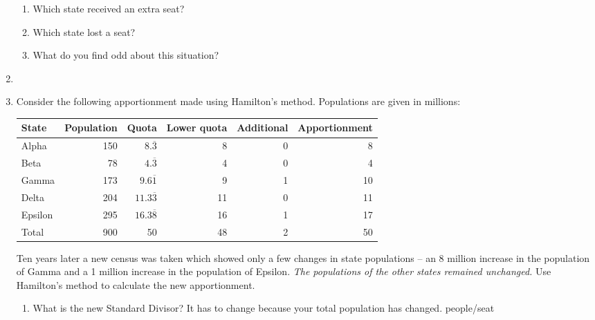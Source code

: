 \begin{enumerate}
\begin{enumerate}
	
		\item Which state received an extra seat?\hrulefill
		\item Which state lost a seat?\hrulefill
		\item What do you find odd about this situation? \hrulefill
	\end{enumerate}

	\item {} 
\clearpage
	\item Consider the following apportionment made using Hamilton's method.  Populations are given in millions:
	
	\begin{center}
		\begin{tabular}{lrrrrr} \hline
	State & Population & Quota & Lower quota & Additional & Apportionment \\\hline
	Alpha & 150 & $8.\overline{3}$ & 8 & 0 & 8 \\\hline
	Beta & 78 & $4.\overline{3}$ & 4 & 0 & 4 \\\hline
	Gamma & 173 & $9.6\overline{1}$ & 9 & 1 & 10 \\\hline
	Delta & 204 & $11.3\overline{3}$ & 11 &0 & 11 \\\hline
	Epsilon & 295 & $16.3\overline{8}$ & 16 & 1 & 17 \\\hline\hline
	
	Total & 900 & 50 & 48 & 2 & 50 \\\hline
	\end{tabular}
	\end{center}
	
	Ten years later a new census was taken which showed only a few changes in state populations -- an 8 million increase in the population of Gamma and a 1 million increase in the population of Epsilon.  \emph{The populations of the other states remained unchanged.}  Use Hamilton's method to calculate the new apportionment.
	\begin{enumerate}
		\item What is the new Standard Divisor?  It has to change because your total population has changed.  people/seat \fi \hrulefill
	

\end{enumerate}
\end{enumerate}
